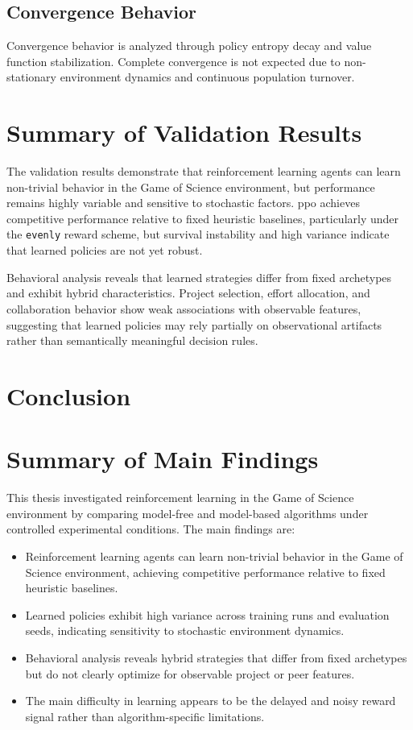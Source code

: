 \documentclass[english,bachelor]{hsluthesis}
\begin{document}
\subsection{Convergence Behavior}
Convergence behavior is analyzed through policy entropy decay and value function stabilization. Complete convergence is not expected due to non-stationary environment dynamics and continuous population turnover.

\section{Summary of Validation Results}

The validation results demonstrate that reinforcement learning agents can learn non-trivial behavior in the Game of Science environment, but performance remains highly variable and sensitive to stochastic factors. \gls{ppo} achieves competitive performance relative to fixed heuristic baselines, particularly under the \texttt{evenly} reward scheme, but survival instability and high variance indicate that learned policies are not yet robust.

Behavioral analysis reveals that learned strategies differ from fixed archetypes and exhibit hybrid characteristics. Project selection, effort allocation, and collaboration behavior show weak associations with observable features, suggesting that learned policies may rely partially on observational artifacts rather than semantically meaningful decision rules.

\section{Conclusion}

\section{Summary of Main Findings}

This thesis investigated reinforcement learning in the Game of Science environment by comparing model-free and model-based algorithms under controlled experimental conditions. The main findings are:

\begin{itemize}
    \item Reinforcement learning agents can learn non-trivial behavior in the Game of Science environment, achieving competitive performance relative to fixed heuristic baselines.
    \item Learned policies exhibit high variance across training runs and evaluation seeds, indicating sensitivity to stochastic environment dynamics.
    \item Behavioral analysis reveals hybrid strategies that differ from fixed archetypes but do not clearly optimize for observable project or peer features.
    \item The main difficulty in learning appears to be the delayed and noisy reward signal rather than algorithm-specific limitations.
\end{itemize}
\end{document}
